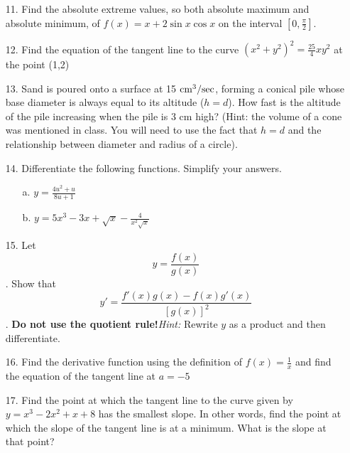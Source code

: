 \documentclass[11pt,reqno]{article}
\theoremstyle{definition}
\begin{document}
\begin{enumerate}
	\item[11.] Find the absolute extreme values, so both absolute maximum and absolute minimum, of $f(x) = x + 2 \sin x \cos x$ on the interval $[0, \frac{\pi}{2}]$.
	\item[12.] Find the equation of the tangent line to the curve $(x^2 + y^2)^2 = \frac{25}{4}xy^2$ at the point (1,2)
	\item[13.] Sand is poured onto a surface at 15 $\textnormal{cm}^3 / \textnormal{sec}$, forming a conical pile whose base diameter is always equal to its altitude ($h = d$). How fast is the altitude of the pile increasing when the pile is 3 cm high? (Hint: the volume of a cone was mentioned in class. You will need to use the fact that $h = d$ and the relationship between diameter and radius of a circle). 
	\item[14.]  Differentiate the following functions. Simplify your answers.
	\begin{enumerate}
		\item[a.] $y = \frac{4u^2 + u}{8u + 1}$ 
		\item[b.] $ y = 5 x^3 - 3 x + \sqrt{x} - \frac{4}{x^2 \sqrt{x}}$
	\end{enumerate}  
	\item[15.] Let \[y = \frac{f(x)}{g(x)}\]. Show that \[y' = \frac{f'(x) g(x) - f(x) g'(x)}{[g(x)]^2}\]. \textbf{Do not use the quotient rule!}\textit{Hint:} Rewrite $y$ as a product and then differentiate. 
	\item[16.] Find the derivative function using the definition of $f(x) = \frac{1}{x}$ and find the equation of the tangent line at $a = -5$
	\item[17.] Find the point at which the tangent line to the curve given by $y = x^3 - 2x^2 + x + 8$ has the smallest slope. In other words, find the point at which the slope of the tangent line is at a minimum. What is the slope at that point? 
	
	\end{enumerate}
	
	



	
	
	
	
\end{document}
